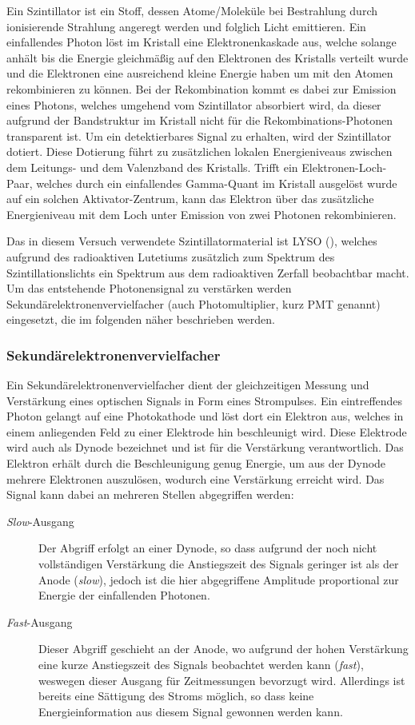 \documentclass[11pt, a4paper]{article}
\numberwithin{equation}{section}
\begin{document}
Ein Szintillator ist ein Stoff, dessen Atome/Moleküle bei Bestrahlung durch ionisierende Strahlung angeregt werden und folglich Licht emittieren.
Ein einfallendes Photon löst im Kristall eine Elektronenkaskade aus, welche solange anhält bis die Energie gleichmäßig auf den Elektronen des Kristalls verteilt wurde und die Elektronen eine ausreichend kleine Energie haben um mit den Atomen rekombinieren zu können.
Bei der Rekombination kommt es dabei zur Emission eines Photons, welches umgehend vom Szintillator absorbiert wird, da dieser aufgrund der Bandstruktur im Kristall nicht für die Rekombinations-Photonen transparent ist.
Um ein detektierbares Signal zu erhalten, wird der Szintillator dotiert.
Diese Dotierung führt zu zusätzlichen lokalen Energieniveaus zwischen dem Leitungs- und dem Valenzband des Kristalls.
Trifft ein Elektronen-Loch-Paar, welches durch ein einfallendes Gamma-Quant im Kristall ausgelöst wurde auf ein solchen Aktivator-Zentrum, kann das Elektron über das zusätzliche Energieniveau mit dem Loch unter Emission von zwei Photonen rekombinieren.

Das in diesem Versuch verwendete Szintillator\-material ist LYSO (), welches aufgrund des radioaktiven Lute\-tiums zusätzlich zum Spektrum des Szin\-tillations\-lichts ein Spektrum aus dem radioaktiven Zerfall beobachtbar macht.
Um das entstehende Photonensignal zu verstärken werden Sekundärelektronenvervielfacher (auch Photomultiplier, kurz PMT genannt) eingesetzt, die im folgenden näher beschrieben werden.

\subsubsection{Sekundärelektronenvervielfacher}

Ein Sekundärelektronenvervielfacher dient der gleichzeitigen Messung und Verstärkung eines optischen Signals in Form eines Strompulses.
Ein eintreffendes Photon gelangt auf eine Photokathode und löst dort ein Elektron aus, welches in einem anliegenden Feld zu einer Elektrode hin beschleunigt wird.
Diese Elektrode wird auch als Dynode bezeichnet und ist für die Verstärkung verantwortlich.
Das Elektron erhält durch die Beschleunigung genug Energie, um aus der Dynode mehrere Elektronen auszulösen, wodurch eine Verstärkung erreicht wird.
Das Signal kann dabei an mehreren Stellen abgegriffen werden:
\begin{description}
	\item[\textit{Slow}-Ausgang]Der Abgriff erfolgt an einer Dynode, so dass aufgrund der noch nicht vollständigen Verstärkung die Anstiegszeit des Signals geringer ist als der Anode (\textit{slow}), jedoch ist die hier abgegriffene Amplitude proportional zur Energie der einfallenden Photonen.
	\item[\textit{Fast}-Ausgang]Dieser Abgriff geschieht an der Anode, wo aufgrund der hohen Verstärkung eine kurze Anstiegszeit des Signals beobachtet werden kann (\textit{fast}), weswegen dieser Ausgang für Zeitmessungen bevorzugt wird. Allerdings ist bereits eine Sättigung des Stroms möglich, so dass keine Energieinformation aus diesem Signal gewonnen werden kann.
\end{description}
\end{document}
